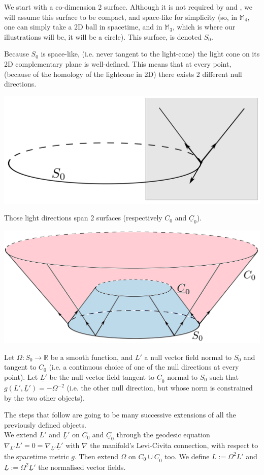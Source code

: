 \documentclass[a4paper,11pt]{article}
\numberwithin{equation}{section}
\theoremstyle{definition}
\begin{document}
We start with a co-dimension 2 surface. Although it is not required by \cite{Chris} and \cite{Art}, we will assume this surface to be compact, and space-like for simplicity (so, in $\mathbb{M}_4$, one can simply take a 2D ball in spacetime, and in $\mathbb{M}_3$, which is where our illustrations will be, it will be a circle). This surface, is denoted $S_0$.

Because $S_0$ is space-like, (i.e. never tangent to the light-cone) the light cone on its 2D complementary plane is well-defined. This means that at every point, (because of the homology of the lightcone in 2D) there exists 2 different null directions. 
\begin{center}
    \includegraphics [width=0.75\linewidth] {Pictures/00_Start.png}
\end{center}
Those light directions span 2 surfaces (respectively $C_0$ and $\underline{C}_0$).
\begin{center}
    \includegraphics [width=0.75\linewidth] {Pictures/01_Surface.png}
\end{center}

Let $\Omega: S_0 \to \mathbb{R}$ be a smooth function, and $L'$ a null vector field normal to $S_0$ and tangent to $C_0$ (i.e. a continuous choice of one of the null directions at every point). Let $\underline{L}'$ be the null vector field tangent to $\underline{C}_0$ normal to $S_0$ such that $g(L',\underline{L}')=-\Omega^{-2}$ (i.e. the other null direction, but whose norm is constrained by the two other objects).

The steps that follow are going to be many successive extensions of all the previously defined objects.\\
We extend $L'$ and $\underline{L}'$ on $C_0$ and $\underline{C}_0$ through the geodesic equation $\nabla_{L'}L'=0=\nabla_{\underline{L}'}\underline{L}'$ with $\nabla$ the manifold's Levi-Civita connection, with respect to the spacetime metric $g$. Then extend $\Omega$ on $C_0\cup\underline{C}_0$ too. We define $L:=\Omega^2L'$ and $\underline{L} :=\Omega^2 \underline{L}'$ the normalised vector fields.
\end{document}
